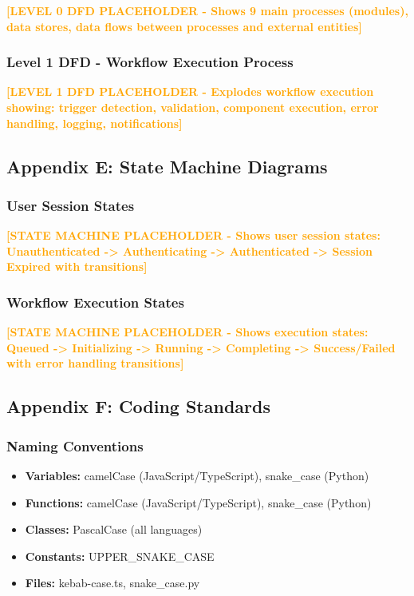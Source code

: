 \documentclass[12pt,a4paper]{article}
\begin{document}
\textcolor{orange}{\textbf{[LEVEL 0 DFD PLACEHOLDER - Shows 9 main processes (modules), data stores, data flows between processes and external entities]}}

\subsubsection{Level 1 DFD - Workflow Execution Process}

\textcolor{orange}{\textbf{[LEVEL 1 DFD PLACEHOLDER - Explodes workflow execution showing: trigger detection, validation, component execution, error handling, logging, notifications]}}

\subsection{Appendix E: State Machine Diagrams}

\subsubsection{User Session States}

\textcolor{orange}{\textbf{[STATE MACHINE PLACEHOLDER - Shows user session states: Unauthenticated -> Authenticating -> Authenticated -> Session Expired with transitions]}}

\subsubsection{Workflow Execution States}

\textcolor{orange}{\textbf{[STATE MACHINE PLACEHOLDER - Shows execution states: Queued -> Initializing -> Running -> Completing -> Success/Failed with error handling transitions]}}

\subsection{Appendix F: Coding Standards}

\subsubsection{Naming Conventions}
\begin{itemize}
    \item \textbf{Variables:} camelCase (JavaScript/TypeScript), snake\_case (Python)
    \item \textbf{Functions:} camelCase (JavaScript/TypeScript), snake\_case (Python)
    \item \textbf{Classes:} PascalCase (all languages)
    \item \textbf{Constants:} UPPER\_SNAKE\_CASE
    \item \textbf{Files:} kebab-case.ts, snake\_case.py
\end{itemize}
\end{document}
